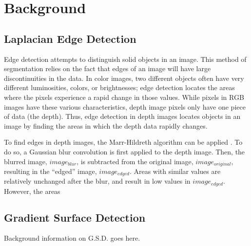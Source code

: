 
\section{Background}
\label{sec:background}

\subsection{Laplacian Edge Detection}
\label{subsec:laplacian}
Edge detection attempts to distinguish solid objects in an image. This
method of segmentation relies on the fact that edges of an image will
have large discontinuities in the data. In color images, two different
objects often have very different luminosities, colors, or
brightnesses; edge detection locates the areas where the pixels
experience a rapid change in those values. While pixels in RGB images
have these various characteristics, depth image pixels only have one
piece of data (the depth). Thus, edge detection in depth images
locates objects in an image by finding the areas in which the depth
data rapidly changes. 

To find edges in depth images, the Marr-Hildreth algorithm can be
applied \cite{marr}. To do so, a Gaussian blur convolution is first
applied to the depth image. Then, the blurred image, $image_{blur}$,
is subtracted from the original image, $image_{original}$, resulting
in the ``edged'' image, $image_{edged}$. Areas with similar values are
relatively unchanged after the blur, and result in low values in
$image_{edged}$. However, the areas    

\subsection{Gradient Surface Detection}
\label{subsec:gradient}
Background information on G.S.D. goes here.


